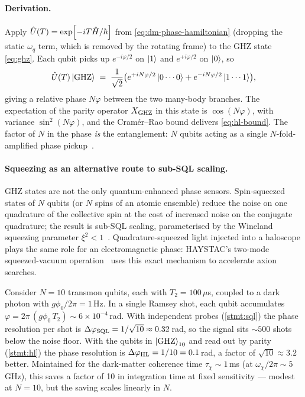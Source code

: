 \paragraph{Derivation.}
Apply $\hat{U}(T)=\exp[-i T \hat{H}/\hbar]$ from
\cref{eq:dm-phase-hamiltonian} (dropping the static
$\omega_q$ term, which is removed by the rotating frame) to
the GHZ state \cref{eq:ghz}. Each qubit picks up
$e^{-i\varphi/2}$ on $\ket 1$ and $e^{+i\varphi/2}$ on
$\ket 0$, so
\begin{equation}
\hat{U}(T)\ket{\rm GHZ} \;=\; \frac{1}{\sqrt 2}
\bigl(e^{+iN\varphi/2}\ket{0\cdots 0}
+ e^{-iN\varphi/2}\ket{1\cdots 1}\bigr),
\end{equation}
giving a relative phase $N\varphi$ between the two
many-body branches. The expectation of the parity operator
$X_{\rm GHZ}$ in this state is $\cos(N\varphi)$, with
variance $\sin^2(N\varphi)$, and the Cram\'{e}r--Rao bound
delivers \cref{eq:hl-bound}. The factor of $N$ in the phase
\emph{is} the entanglement: $N$ qubits acting as a single
$N$-fold-amplified phase pickup~\cite{giovannetti2011,pezze2018}.

\paragraph{Squeezing as an alternative route to sub-SQL scaling.}
GHZ states are not the only quantum-enhanced phase sensors.
Spin-squeezed states of $N$ qubits (or $N$ spins of an atomic
ensemble) reduce the noise on one quadrature of the collective
spin at the cost of increased noise on the conjugate
quadrature; the result is sub-SQL scaling, parameterised by
the Wineland squeezing parameter $\xi^2<1$~\cite{wineland1992}.
Quadrature-squeezed light injected into a haloscope plays the
same role for an electromagnetic phase: HAYSTAC's two-mode
squeezed-vacuum operation~\cite{malnou2019,haystac2021} uses
this exact mechanism to accelerate axion searches.

\begin{example}
\label{ex:hl-darkphoton}
Consider $N=10$ transmon qubits, each with $T_2=100\,\mu$s,
coupled to a dark photon with $g\phi_0/2\pi=1$\,Hz. In a single
Ramsey shot, each qubit accumulates $\varphi=2\pi\,(g\phi_0\,T_2)
\sim 6\times 10^{-4}$\,rad. With independent probes
(\cref{stmt:sql}) the phase resolution per shot is
$\Delta\varphi_{\rm SQL}=1/\sqrt{10}\approx 0.32$\,rad, so the
signal sits $\sim 500$ shots below the noise floor. With the
qubits in $\ket{\rm GHZ}_{10}$ and read out by parity
(\cref{stmt:hl}) the phase resolution is
$\Delta\varphi_{\rm HL}=1/10=0.1$\,rad, a factor of
$\sqrt{10}\approx 3.2$ better. Maintained for the dark-matter
coherence time $\tau_\chi\sim 1$\,ms (at $\omega_\chi/2\pi
\sim 5$\,GHz), this saves a factor of 10 in integration time at
fixed sensitivity --- modest at $N=10$, but the saving scales
linearly in $N$.
\end{example}

